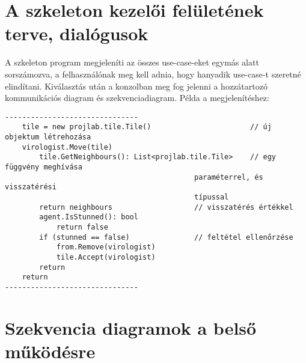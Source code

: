 \section{A szkeleton kezelői felületének terve, dialógusok}

A szkeleton program megjeleníti az összes use-case-eket egymás alatt sorszámozva, a felhasználónak meg kell adnia, hogy hanyadik use-case-t szeretné elindítani. Kiválasztás után a konzolban meg fog jelenni a hozzátartozó kommunikációs diagram és szekvenciadiagram. Példa a megjelenítéshez:

\begin{verbatim}
-------------------------------
    tile = new projlab.tile.Tile()                       // új objektum létrehozása
    virologist.Move(tile)
        tile.GetNeighbours(): List<projlab.tile.Tile>    // egy függvény meghívása
                                            paraméterrel, és visszatérési
                                            típussal
        return neighbours                   // visszatérés értékkel
        agent.IsStunned(): bool
            return false
        if (stunned == false)               // feltétel ellenőrzése
            from.Remove(virologist)
            tile.Accept(virologist)
        return
    return
-------------------------------
\end{verbatim}


\section{Szekvencia diagramok a belső működésre}










